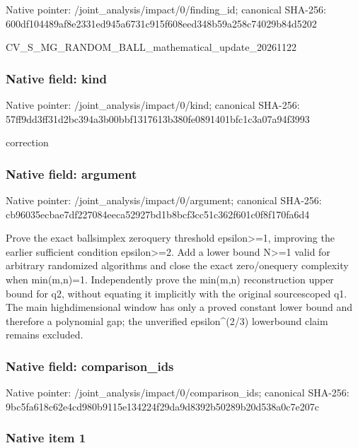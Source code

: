 \documentclass[10pt,a4paper]{article}
\begin{document}
Native pointer: /joint\_analysis/impact/0/finding\_id; canonical SHA-256: 600df104489af8e2331ed945\allowbreak{}a6731c915f608eed348b59a2\allowbreak{}58c74029b84d5202


CV\_S\_MG\_RANDOM\_BALL\_math\allowbreak{}ematical\_update\_20261122


\subsubsection{Native field: kind}


Native pointer: /joint\_analysis/impact/0/kind; canonical SHA-256: 57ff9dd3ff31d2bc394a3b00\allowbreak{}bbf1317613b380fe0891401b\allowbreak{}fc1c3a07a94f3993


correction


\subsubsection{Native field: argument}


Native pointer: /joint\_analysis/impact/0/argument; canonical SHA-256: cb96035ecbae7df227084eec\allowbreak{}a52927bd1b8bcf3cc51c362f\allowbreak{}601c0f8f170fa6d4


Prove the exact ballsimplex zeroquery threshold epsilon>=1, improving the earlier sufficient condition epsilon>=2. Add a lower bound N>=1 valid for arbitrary randomized algorithms and close the exact zero/onequery complexity when min(m,n)=1. Independently prove the min(m,n) reconstruction upper bound for q2, without equating it implicitly with the original sourcescoped q1. The main highdimensional window has only a proved constant lower bound and therefore a polynomial gap; the unverified epsilon\textasciicircum{}(2/3) lowerbound claim remains excluded.


\subsubsection{Native field: comparison\_ids}


Native pointer: /joint\_analysis/impact/0/comparison\_ids; canonical SHA-256: 9bc5fa618c62e4cd980b9115\allowbreak{}e134224f29da9d8392b50289\allowbreak{}b20d538a0c7e207c



\subsubsection{Native item 1}
\end{document}
